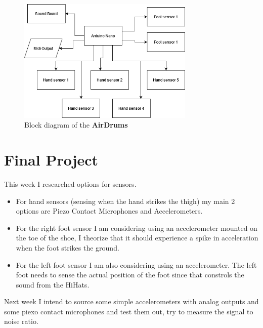 \documentclass{article}
\begin{document}
\begin{figure}[h]
    \centering
    \includegraphics[width=0.75\textwidth]{HW2/BlockDiagram.png}
    \caption{Block diagram of the \textbf{AirDrums}}
    \label{hw1:fig:blockdiagram}
\end{figure}

\section*{Final Project}

This week I researched options for sensors.
\begin{itemize}
    \item  For hand sensors (sensing when the hand strikes the thigh) my main 2 options are Piezo Contact Microphones and Accelerometers.

\item For the right foot sensor I am considering using an accelerometer mounted on the toe of the shoe, I theorize that it should experience a spike in acceleration when the foot strikes the ground.

\item For the left foot sensor I am also considering using an accelerometer. The left foot needs to sense the actual position of the foot since that constrols the sound from the HiHats. 

\end{itemize}
Next week I intend to source some simple accelerometers with analog outputs and some piexo contact microphones and test them out, try to measure the signal to noise ratio.
\end{document}
